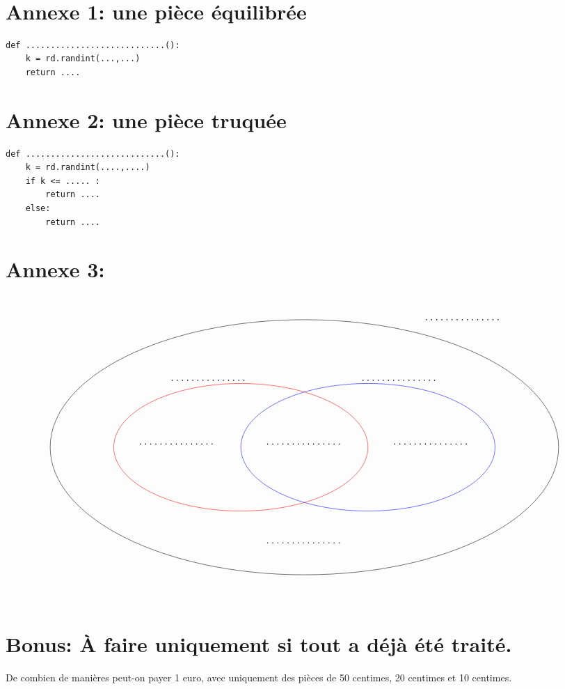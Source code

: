 \documentclass[a4paper,11pt]{article}
\theoremstyle{definition}
\begin{document}
\newpage
{}\chead{}\renewcommand{\headrulewidth}{0.4pt}\renewcommand{\footrulewidth}{0.4pt}

\hfill\\[0.5cm]
	
\section*{Annexe 1: une pièce équilibrée}


\begin{lstlisting}[style=stylepython]
def ............................():
	k = rd.randint(...,...)	
	return ....			
\end{lstlisting}
\section*{Annexe 2: une pièce truquée}
\begin{lstlisting}[style=stylepython]
def ............................():
	k = rd.randint(....,....)
	if k <= ..... :
		return ....
	else:
		return ....			
\end{lstlisting}
\section*{Annexe 3:}
\hfil\\[1cm]

$$\begin{tikzpicture}[scale=2.3]
\draw[red](-1,0) ellipse [x radius=2cm, y radius=1cm];
\draw(-2,0.05) node{\large$\dots\dots\dots\dots\dots$};
\draw(2,0.05) node{\large$\dots\dots\dots\dots\dots$};
\draw(0,-1.5) node[]{\large$\dots\dots\dots\dots\dots$};
\draw(0,0.05) node{\large$\dots\dots\dots\dots\dots$};
\draw(2.5,2) node{\large$\dots\dots\dots\dots\dots$};
\draw(1.5,1.05) node{\large$\dots\dots\dots\dots\dots$};
\draw(-1.5,1.05) node{\large$\dots\dots\dots\dots\dots$};
\draw[blue](1,0) ellipse [x radius=2cm, y radius=1cm];
\draw[black](0,0) ellipse [x radius=4cm, y radius=2cm];
\end{tikzpicture}$$

\hfill\\[1cm]

\section*{Bonus: À faire uniquement si tout a déjà été traité.}
De combien de manières peut-on payer 1 euro, avec uniquement des pièces de 50 centimes, 20 centimes et 10 centimes.
\end{document}
